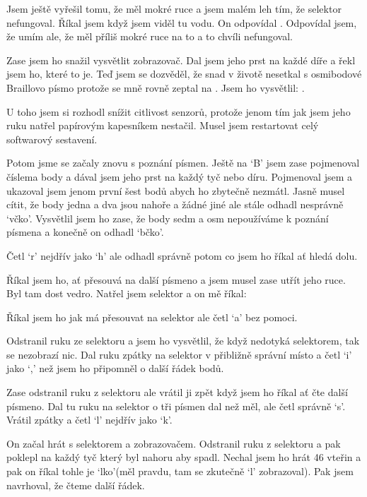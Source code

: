 Jsem ještě vyřešil tomu, že měl mokré ruce a jsem malém leh tím, že selektor nefungoval.  Říkal jsem  když jsem viděl tu vodu.  On odpovídal .  Odpovídal jsem, že umím ale, že měl příliš mokré ruce na to a to chvíli nefungoval.

Zase jsem ho snažil vysvětlit zobrazovač.  Dal jsem jeho prst na každé díře a řekl jsem ho, které to je.  Teď jsem se dozvěděl, že snad v životě nesetkal s osmibodové Braillovo písmo protože se mně rovně zeptal na .  Jsem ho vysvětlil: .

U toho jsem si rozhodl snížit citlivost senzorů, protože jenom tím jak jsem jeho ruku natřel papírovým kapesníkem nestačil.  Musel jsem restartovat celý softwarový sestavení.

Potom jsme se začaly znovu s poznání písmen.  Ještě na `B' jsem zase pojmenoval číslema body a dával jsem jeho prst na každý tyč nebo díru. Pojmenoval jsem a ukazoval jsem jenom první šest bodů abych ho zbytečně nezmátl.  Jasně musel cítit, že body jedna a dva jsou nahoře a žádné jiné ale stále odhadl nesprávně `včko'.  Vysvětlil jsem ho zase, že body sedm a osm nepoužíváme k poznání písmena a konečně on odhadl `bčko'.

Četl `r' nejdřív jako `h' ale odhadl správně potom co jsem ho říkal ať hledá dolu.

Říkal jsem ho, ať přesouvá na další písmeno a jsem musel zase utřít jeho ruce.  Byl tam dost vedro.  Natřel jsem selektor a on mě říkal: 

Říkal jsem ho jak má přesouvat na selektor ale četl `a' bez pomoci.

Odstranil ruku ze selektoru a jsem ho vysvětlil, že když nedotyká selektorem, tak se nezobrazí nic.  Dal ruku zpátky na selektor v přibližně správní místo a četl `i' jako `,' než jsem ho připomněl o další řádek bodů.

Zase odstranil ruku z selektoru ale vrátil ji zpět když jsem ho říkal ať čte další písmeno. Dal tu ruku na selektor o tři písmen dal než měl, ale četl správně `s'. Vrátil zpátky a četl `l' nejdřív jako `k'.

On začal hrát s selektorem a zobrazovačem.  Odstranil ruku z selektoru a pak poklepl na každý tyč který byl nahoru aby spadl.  Nechal jsem ho hrát 46 vteřin a pak on říkal tohle je `lko'(měl pravdu, tam se zkutečně `l' zobrazoval).  Pak jsem navrhoval, že čteme další řádek.

